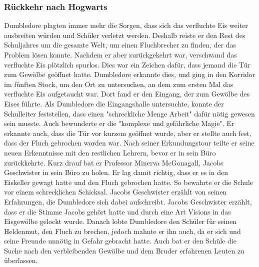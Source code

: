 \documentclass[a4paper, 10pt]{article}
\begin{document}
\subsubsection*{Rückkehr nach Hogwarts}
Dumbledore plagten immer mehr die Sorgen, dass sich das verfluchte Eis weiter ausbreiten würden und Schüler verletzt werden. Deshalb reiste er den Rest des Schuljahres um die gesamte Welt, um einen Fluchbrecher zu finden, der das Problem lösen konnte. Nachdem er aber zurückgekehrt war, verschwand das verfluchte Eis plötzlich spurlos. Dies war ein Zeichen dafür, dass jemand die Tür zum Gewölbe geöffnet hatte. Dumbledore erkannte dies, und ging in den Korridor im fünften Stock, um den Ort zu untersuchen, an dem zum ersten Mal das verfluchte Eis aufgetaucht war. Dort fand er den Eingang, der zum Gewölbe des Eises führte. Als Dumbledore die Eingangshalle untersuchte, konnte der Schulleiter feststellen, dass einen "schreckliche Menge Arbeit" dafür nötig gewesen sein musste. Auch bewunderte er die "komplexe und gefährliche Magie". Er erkannte auch, dass die Tür vor kurzem geöffnet wurde, aber er stellte auch fest, dass der Fluch gebrochen worden war.
\vspace{10pt}
\newline
Nach seiner Erkundungstour teilte er seine neuen Erkenntnisse mit den restlichen Lehrern, bevor er in sein Büro zurückkehrte. Kurz drauf bat er Professor Minerva McGonagall, Jacobs Geschwister in sein Büro zu holen. Er lag damit richtig, dass er es in den Eiskeller gewagt hatte und den Fluch gebrochen hatte. So bewahrte er die Schule vor einem schrecklichen Schicksal. Jacobs Geschwister erzählt von seinen Erfahrungen, die Dumbledore sich dabei aufschreibt. Jacobs Geschwister erzählt, dass er die Stimme Jacobs gehört hatte und durch eine Art Visions in das Eisgewölbe gelockt wurde. Danach lobte Dumbledore den Schüler für seinen Heldenmut, den Fluch zu brechen, jedoch mahnte er ihn auch, da er sich und seine Freunde unnötig in Gefahr gebracht hatte. Auch bat er den Schüle die Suche nach den verbleibenden Gewölbe und dem Bruder erfahrenen Leuten zu überlassen.
\end{document}
